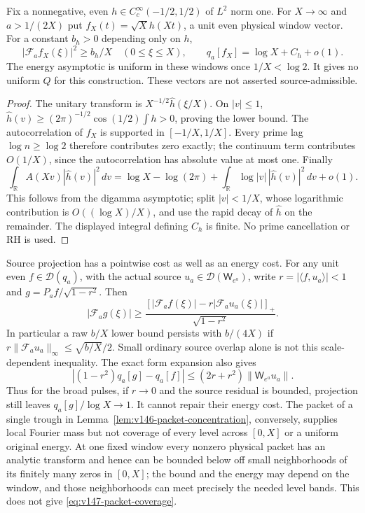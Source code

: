 \begin{proposition}
\label{prop:v147-broad-packet}
Fix a nonnegative, even $h\in C_c^\infty(-1/2,1/2)$ of $L^2$ norm
one. For $X\to\infty$ and $a>1/(2X)$ put
$f_X(t)=\sqrt X h(Xt)$, a unit even physical window vector. For a
constant $b_h>0$ depending only on $h$,
\begin{equation}\label{eq:v147-broad-packet}
 |\mathcal F_af_X(\xi)|^2\ge b_h/X\quad(0\le\xi\le X),
 \qquad q_a[f_X]=\log X+C_h+o(1).
\end{equation}
The energy asymptotic is uniform in these windows once
$1/X<\log2$. It gives no uniform $Q$ for this construction.
These vectors are not asserted source-admissible.
\end{proposition}
\begin{proof}
The unitary transform is $X^{-1/2}\widehat h(\xi/X)$. On $|v|\le1$,
$\widehat h(v)\ge(2\pi)^{-1/2}\cos(1/2)\int h>0$, proving the
lower bound. The autocorrelation of $f_X$ is supported in
$[-1/X,1/X]$. Every prime lag $\log n\ge\log2$ therefore contributes
zero exactly; the continuum term contributes $O(1/X)$, since the
autocorrelation has absolute value at most one. Finally
\[
 \int_{\mathbb R}A(Xv)|\widehat h(v)|^2\,dv
 =\log X-\log(2\pi)
       +\int_{\mathbb R}\log|v|\,|\widehat h(v)|^2\,dv+o(1).
\]
This follows from the digamma asymptotic; split $|v|<1/X$, whose
logarithmic contribution is $O((\log X)/X)$, and use the rapid decay
of $\widehat h$ on the remainder. The displayed integral defining
$C_h$ is finite. No prime cancellation or RH is used.
\end{proof}

Source projection has a pointwise cost as well as an energy cost. For
any unit even $f\in\mathcal D(q_a)$, with the actual source
$u_a\in\mathcal D(\mathsf W_{e^a})$, write $r=|\langle f,u_a\rangle|<1$ and
$g=P_af/\sqrt{1-r^2}$. Then
\begin{equation}\label{eq:v147-projected-density}
 |\mathcal F_ag(\xi)|\ge
 \frac{[|\mathcal F_af(\xi)|-r|\mathcal F_au_a(\xi)|]_+}
      {\sqrt{1-r^2}}.
\end{equation}
In particular a raw $b/X$ lower bound persists with $b/(4X)$ if
$r\|\mathcal F_au_a\|_\infty\le\sqrt{b/X}/2$. Small ordinary
source overlap alone is not this scale-dependent inequality.
The exact form expansion also gives
\[
 \left|(1-r^2)q_a[g]-q_a[f]\right|
 \le(2r+r^2)\|\mathsf W_{e^a}u_a\|.
\]
Thus for the broad pulses, if $r\to0$ and the source residual is
bounded, projection still leaves $q_a[g]/\log X\to1$.
It cannot repair their energy cost. The packet of a single trough in
Lemma~\ref{lem:v146-packet-concentration}, conversely, supplies local
Fourier mass but not coverage of every level across $[0,X]$ or a
uniform original energy. At one fixed window every nonzero physical
packet has an analytic transform and hence can be bounded below off
small neighborhoods of its finitely many zeros in $[0,X]$; the bound
and the energy may depend on the window, and those neighborhoods
can meet precisely the needed level bands. This does not give
\eqref{eq:v147-packet-coverage}.

